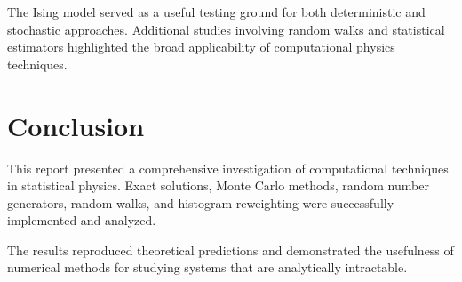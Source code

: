 \documentclass[a4paper]{article}
\begin{document}
The Ising model served as a useful testing ground for both deterministic and stochastic approaches. Additional studies involving random walks and statistical estimators highlighted the broad applicability of computational physics techniques.

\section{Conclusion}

This report presented a comprehensive investigation of computational techniques in statistical physics. Exact solutions, Monte Carlo methods, random number generators, random walks, and histogram reweighting were successfully implemented and analyzed.

The results reproduced theoretical predictions and demonstrated the usefulness of numerical methods for studying systems that are analytically intractable.


\printbibliography
\end{document}
